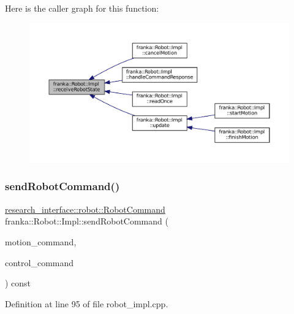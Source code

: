 Here is the caller graph for this function\+:
\nopagebreak
\begin{figure}[H]
\begin{center}
\leavevmode
\includegraphics[width=350pt]{classfranka_1_1Robot_1_1Impl_a15161988fd2644aa2757e196e4488b38_icgraph}
\end{center}
\end{figure}
\mbox{\label{classfranka_1_1Robot_1_1Impl_a4c927a26f2a6eceb352ce3af49d28c37}} 
\subsubsection{\texorpdfstring{send\+Robot\+Command()}{sendRobotCommand()}}
{\footnotesize\ttfamily \hyperlink{structresearch__interface_1_1robot_1_1RobotCommand}{research\+\_\+interface\+::robot\+::\+Robot\+Command} franka\+::\+Robot\+::\+Impl\+::send\+Robot\+Command (\begin{DoxyParamCaption}\item[{const \hyperlink{structresearch__interface_1_1robot_1_1MotionGeneratorCommand}{research\+\_\+interface\+::robot\+::\+Motion\+Generator\+Command} $\ast$}]{motion\+\_\+command,  }\item[{const \hyperlink{structresearch__interface_1_1robot_1_1ControllerCommand}{research\+\_\+interface\+::robot\+::\+Controller\+Command} $\ast$}]{control\+\_\+command }\end{DoxyParamCaption}) const\hspace{0.3cm}{\ttfamily [private]}}



Definition at line 95 of file robot\+\_\+impl.\+cpp.



